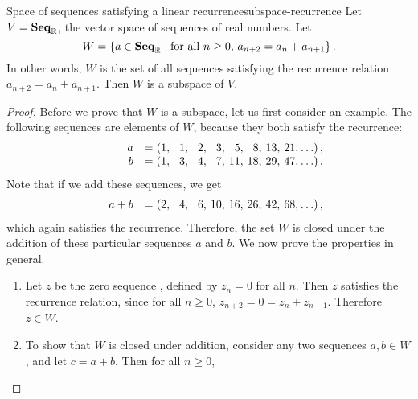 \begin{example}{Space of sequences satisfying a linear recurrence}{subspace-recurrence}
  Let $V=\mathbf{Seq}_{\mathbb{R}}$, the vector space of sequences of real
  numbers. Let
  \begin{equation*}
    W = \left\{a \in \mathbf{Seq}_{\mathbb{R}} \mid \mbox{for all $n\geq 0$, $a_{n+2}=a_n+a_{n+1}$}\right\}.
  \end{equation*}
  In other words, $W$ is the set of all sequences satisfying the
  recurrence%
   relation
  $a_{n+2}=a_n+a_{n+1}$. Then $W$ is a subspace of\/ $V$.
\end{example}

\begin{proof}
  \def\x#1{\makebox[1.2em][r]{$#1$}}
  \def\y#1{\makebox[3em][r]{$#1$}}
  \def\z#1{\makebox[0em][l]{$#1$}}
  Before we prove that $W$ is a subspace, let us first consider an
  example. The following sequences are elements of\/ $W$, because they
  both satisfy the recurrence:
  \begin{equation*}
    \begin{array}{rc@{}l}
      \y{a} &=& \x{(1},\x{1},\x{2},\x{3},\x{5},\x{8},\x{13},\x{21},\x{\ldots})\z{\,,} \\
      \y{b} &=& \x{(1},\x{3},\x{4},\x{7},\x{11},\x{18},\x{29},\x{47},\x{\ldots})\z{\,.}
    \end{array}
  \end{equation*}
  Note that if we add these sequences, we get
  \begin{equation*}
    \begin{array}{rc@{}l}
      \y{a+b} &=& \x{(2},\x{4},\x{6},\x{10},\x{16},\x{26},\x{42},\x{68},\x{\ldots})\z{\,,} \\
    \end{array}
  \end{equation*}
  which again satisfies the recurrence. Therefore, the set $W$ is
  closed under the addition of these particular sequences $a$ and
  $b$. We now prove the properties in general.
  \begin{enumerate}
  \item Let $z$ be the zero sequence%
    , defined by $z_n=0$ for all $n$.
    Then $z$ satisfies the recurrence relation, since for all $n\geq 0$,
    $z_{n+2}=0=z_n+z_{n+1}$. Therefore $z\in W$.
  \item To show that $W$ is closed under addition, consider any two
    sequences $a,b\in W$, and let $c=a+b$. Then for all $n\geq 0$,
    \begin{equation*}

\end{equation*}
\end{enumerate}
\end{proof}
